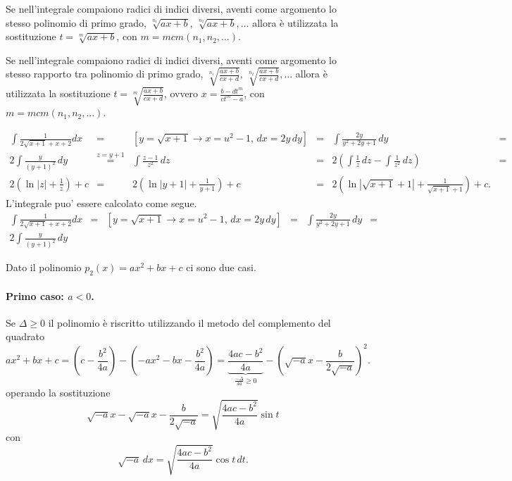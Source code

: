 Se nell'integrale compaiono radici di indici diversi, aventi come argomento lo stesso polinomio di primo grado, $\sqrt[n_1]{ax+b},\, \sqrt[n_2]{ax+b},\hdots$ allora è utilizzata la sostituzione $t=\sqrt[m]{ax+b}$, con $m=mcm(n_1,n_2,\hdots)$.

Se nell'integrale compaiono radici di indici diversi, aventi come argomento lo stesso rapporto tra polinomio di primo grado, $\sqrt[n_1]{\frac{ax+b}{cx+d}},\, \sqrt[n_2]{\frac{ax+b}{cx+d}},\hdots$ allora è utilizzata la sostituzione $t=\sqrt[m]{\frac{ax+b}{cx+d}}$, ovvero $x=\frac{b-dt^m}{ct^m-a}$, con $m=mcm(n_1,n_2,\hdots)$.

\begin{example}
    \begin{equation*}
        \begin{matrix}
            \int\frac{1}{2\sqrt{x+1}+x+2}dx &=& [y = \sqrt{x+1}\rightarrow x=u^2-1,\, dx=2y\,dy] &=& \int\frac{2y}{y^2+2y+1}\, dy &=&\\
            2\int\frac{y}{(y+1)^2}\, dy &\overset{z=y+1}{=}& \int\frac{z-1}{z^2}\, dz &=&2\left(\int\frac{1}{z}\, dz-\int\frac{1}{z^2}\,dz\right) &=&\\
            2(\ln|z|+\frac{1}{z}) + c &=& 2(\ln|y+1|+\frac{1}{y+1}) + c &=& 2(\ln|\sqrt{x+1}+1|+\frac{1}{\sqrt{x+1}+1}) + c.
        \end{matrix}
    \end{equation*}
    L'integrale puo' essere calcolato come segue.
    \begin{equation*}
        \begin{matrix}
            \int\frac{1}{2\sqrt{x+1}+x+2}dx &=& [y = \sqrt{x+1}\rightarrow x=u^2-1,\, dx=2y\,dy] &=& \int\frac{2y}{y^2+2y+1}\, dy &=&\\
            2\int\frac{y}{(y+1)^2}\, dy
        \end{matrix}
    \end{equation*}
\end{example}

Dato il polinomio $p_2(x)=ax^2+bx+c$ ci sono due casi.
\paragraph{Primo caso: $a<0$.} Se $\Delta\geq 0$ il polinomio è riscritto utilizzando il metodo del complemento del quadrato
\begin{equation*}
    ax^2+bx+c=\left(c-\frac{b^2}{4a}\right)-\left(-ax^2-bx-\frac{b^2}{4a}\right)=\underbrace{\frac{4ac-b^2}{4a}}_{\frac{-\Delta}{4a}\geq 0}-\left(\sqrt{-a}x-\frac{b}{2\sqrt{-a}}\right)^2.
\end{equation*}
operando la sostituzione
\begin{equation*}
    \sqrt{-a}x-\sqrt{-a}x-\frac{b}{2\sqrt{-a}}=\sqrt{\frac{4ac-b^2}{4a}}\sin t
\end{equation*}
con
\begin{equation*}
    \sqrt{-a}\,dx = \sqrt{\frac{4ac-b^2}{4a}}\cos t\, dt.
\end{equation*}

